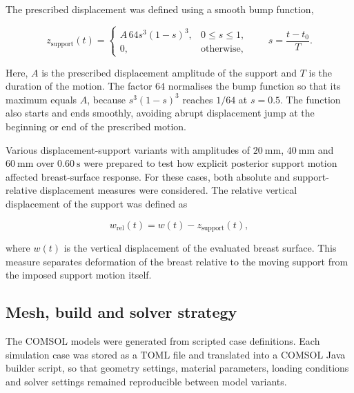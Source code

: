The prescribed displacement was defined using a smooth bump function,

\begin{equation}
z_{\mathrm{support}}(t)
=
\begin{cases}
A\,64s^{3}\left(1-s\right)^{3}, & 0 \leq s \leq 1, \\
0, & \mathrm{otherwise},
\end{cases}
\qquad
s=\frac{t-t_{0}}{T}.
\label{prescribed_support_displacement_profile}
\end{equation}

Here, $A$ is the prescribed displacement amplitude of the support and $T$ is the duration of the motion. The factor $64$ normalises the bump function so that its maximum equals $A$, because $s^{3}(1-s)^{3}$ reaches $1/64$ at $s=0.5$. The function also starts and ends smoothly, avoiding abrupt displacement jump at the beginning or end of the prescribed motion.

Various displacement-support variants with amplitudes of $20~\mathrm{mm}$, $40~\mathrm{mm}$ and $60~\mathrm{mm}$ over $0.60~\mathrm{s}$ were prepared to test how explicit posterior support motion affected breast-surface response. For these cases, both absolute and support-relative displacement measures were considered. The relative vertical displacement of the support was defined as

\begin{equation}
w_{\mathrm{rel}}(t)
=
w(t)-z_{\mathrm{support}}(t),
\label{support_relative_vertical_displacement}
\end{equation}

where $w(t)$ is the vertical displacement of the evaluated breast surface. This measure separates deformation of the breast relative to the moving support from the imposed support motion itself.




\subsection{Mesh, build and solver strategy}
\label{mesh_build_and_solver_strategy}

The COMSOL models were generated from scripted case definitions. Each simulation case was stored as a TOML file and translated into a COMSOL Java builder script, so that geometry settings, material parameters, loading conditions and solver settings remained reproducible between model variants.

